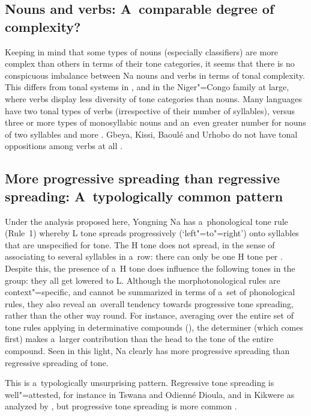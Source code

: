 \subsection{Nouns and verbs: A~comparable degree of complexity?}
\label{sec:limitationsontonaloppositions}

Keeping in mind that some types of nouns (especially classifiers) are more complex than others in terms of their tone categories, it seems that there is no conspicuous imbalance between Na nouns and verbs in terms of tonal complexity. This differs from tonal systems in , and in the Niger"=Congo family at large, where verbs display less diversity of tone categories than nouns. Many  languages have two tonal types of verbs (irrespective of their number of syllables), versus three or more types of {monosyllabic} nouns and an~even greater number for nouns of two syllables and more \citep[183]{creissels1994}. Gbeya, Kissi, Baoulé and Urhobo do not have tonal oppositions among verbs at all \citep[184]{creissels1994}.

\subsection{More progressive spreading than regressive spreading: A~typologically common pattern}
\label{sec:propagationanticipation}

Under the analysis proposed here, Yongning Na has a~phonological tone rule (Rule~1) whereby L tone spreads progressively (‘left"=to"=right’) onto syllables that are unspecified for tone. The H tone does not spread, in the sense of associating to several syllables in a~row: there can only be one H tone per . Despite this, the presence of a~H tone does influence the following tones in the group: they all get lowered to L. Although the morphotonological rules are context"=specific, and cannot be summarized in terms of a~set of phonological rules, they also reveal an~overall tendency towards progressive tone spreading, rather than the other way round. For instance, averaging over the entire set of tone rules applying in determinative compounds (), the determiner (which comes first) makes a~larger contribution than the head to the tone of the entire compound. Seen in this light, Na clearly has more progressive spreading than regressive spreading of tone. 

This is a~typologically unsurprising pattern. Regressive tone spreading is well"=attested, for instance in Tswana and Odienné Dioula, and in Kikwere as analyzed by \citet[177-178]{odden1998b}, but progressive tone spreading is more common \citep[206-207]{creissels1994}. 

